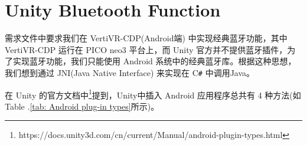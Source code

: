\documentclass[a4paper,10pt]{article}
\begin{document}
	
	
	
	\renewcommand{\figurename}{图} %
	\renewcommand{\contentsname}{目录}
	\renewcommand{\tablename}{表}
		
	\part*{Unity Bluetooth Function}
	
	需求文件中要求我们在 VertiVR-CDP(Android端) 中实现经典蓝牙功能，其中 VertiVR-CDP 运行在 PICO neo3 平台上，而 Unity 官方并不提供蓝牙插件，为了实现蓝牙功能，我们只能使用 Android 系统中的经典蓝牙库。根据这种思想，我们想到通过 JNI(Java Native Interface) 来实现在 C\texttt{\#} 中调用Java。
	
	在 Unity 的官方文档中\footnote{https://docs.unity3d.com/cn/current/Manual/android-plugin-types.html}提到，Unity中插入 Android 应用程序总共有 4 种方法(如Table .\ref{tab: Android plug-in types}所示)。
	
\end{document}
